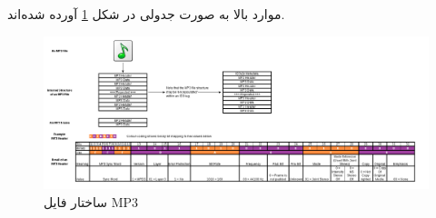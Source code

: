  موارد بالا به صورت جدولی در شکل 
 \ref{mp3_structure}
 آورده شده‌اند.

 \begin{figure}[]
         \centering
         \includegraphics[width=\textwidth]{figs/mp3_file_structure.png}
         \caption{ساختار فایل MP3}
         \label{mp3_structure}
 \end{figure}

